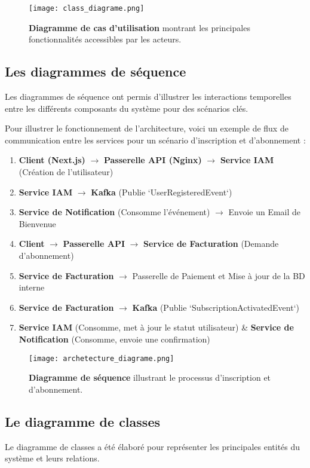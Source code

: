 \begin{figure}[h!]
  \centering
  \texttt{[image: class\_diagrame.png]}
  \caption{\textbf{Diagramme de cas d'utilisation} montrant les principales fonctionnalités accessibles par les acteurs.}
  \label{fig:usecase_diagram}
\end{figure}

\subsection{Les diagrammes de séquence}
Les diagrammes de séquence ont permis d'illustrer les interactions temporelles entre les différents composants du système pour des scénarios clés.

Pour illustrer le fonctionnement de l'architecture, voici un exemple de flux de communication entre les services pour un scénario d'inscription et d'abonnement :
\begin{enumerate}
  \item \textbf{Client (Next.js)} $\rightarrow$ \textbf{Passerelle API (Nginx)} $\rightarrow$ \textbf{Service IAM} (Création de l'utilisateur)
  \item \textbf{Service IAM} $\rightarrow$ \textbf{Kafka} (Publie `UserRegisteredEvent`)
  \item \textbf{Service de Notification} (Consomme l'événement) $\rightarrow$ Envoie un Email de Bienvenue
  \item \textbf{Client} $\rightarrow$ \textbf{Passerelle API} $\rightarrow$ \textbf{Service de Facturation} (Demande d'abonnement)
  \item \textbf{Service de Facturation} $\rightarrow$ Passerelle de Paiement et Mise à jour de la BD interne
  \item \textbf{Service de Facturation} $\rightarrow$ \textbf{Kafka} (Publie `SubscriptionActivatedEvent`)
  \item \textbf{Service IAM} (Consomme, met à jour le statut utilisateur) \& \textbf{Service de Notification} (Consomme, envoie une confirmation)
\end{enumerate}

\begin{figure}[h!]
  \centering
  \texttt{[image: archetecture\_diagrame.png]}
  \caption{\textbf{Diagramme de séquence} illustrant le processus d'inscription et d'abonnement.}
  \label{fig:sequence_diagram}
\end{figure}

\subsection{Le diagramme de classes}
Le diagramme de classes a été élaboré pour représenter les principales entités du système et leurs relations.

